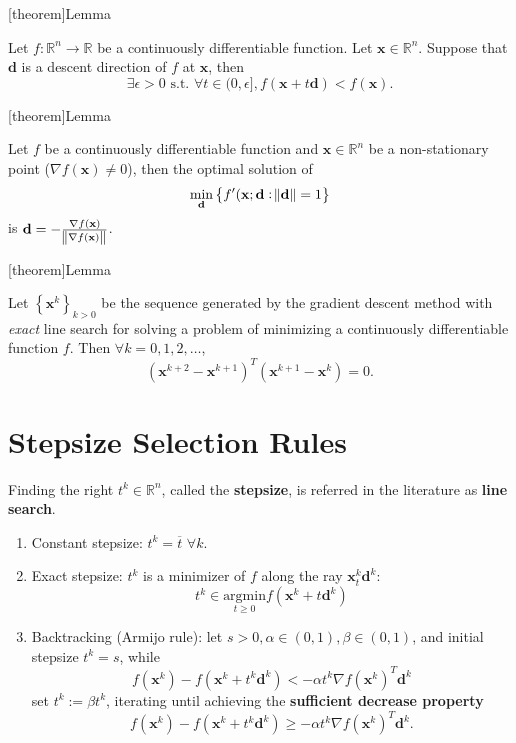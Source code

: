 \documentclass[12pt]{report}
\theoremstyle{definition}
\begin{document}
[theorem]{Lemma}
\begin{descent property}
    Let $f:\mathbb{R}^{n}\rightarrow\mathbb{R}$ be a continuously differentiable function.
    Let $\mathbf{x}\in\mathbb{R}^{n}$. 
    Suppose that $\mathbf{d}$ is a descent direction of $f$ at $\mathbf{x}$,
    then
    \[
        \exists\epsilon>0\text{ s.t. }\forall
        t\in(0,\epsilon],f(\mathbf{x}+t\mathbf{d})<f(\mathbf{x}).
    \]
\end{descent property}

[theorem]{Lemma}
\begin{descent optimal direction}
    Let $f$ be a continuously differentiable function and
    $\mathbf{x}\in\mathbb{R}^{n}$ be a non-stationary point ($\nabla
    f(\mathbf{x})\neq 0$), then the optimal solution of
    \[
        \underset{\mathbf{d}}{\text{min}}\left\{f'(\mathbf{x};\mathbf{d}:\norm{\mathbf{d}}=1\right\}
    \]
    is $\mathbf{d}=-\frac{\nabla f(\mathbf{x})}{\norm{\nabla f(\mathbf{x})}}$.
\end{descent optimal direction}

[theorem]{Lemma}
\begin{zig-zag effect}
    Let ${\left\{\mathbf{x}^k\right\}}_{k>0}$ be the sequence generated by the
    gradient descent method with \emph{exact} line search for solving a problem
    of minimizing a continuously differentiable function $f$. Then $\forall
    k=0,1,2,\ldots$,
    \[
        {(\mathbf{x}^{k+2}-\mathbf{x}^{k+1})}^{T}
        (\mathbf{x}^{k+1}-\mathbf{x}^k)=0.
    \]
\end{zig-zag effect}


\section{Stepsize Selection Rules}

Finding the right $t^k\in\mathbb{R}^{n}$, called the \textbf{stepsize}, is
referred in the literature as \textbf{line search}.

\begin{enumerate}
    \item Constant stepsize: $t^k=\overline{t}$ $\forall k$.
    \item Exact stepsize: $t^{k}$ is a minimizer of $f$ along the ray
        $\mathbf{x}^{k}_t\mathbf{d}^{k}$:
        \[
            t^{k}\in \underset{t\ge
            0}{\text{argmin}}f(\mathbf{x}^{k}+t\mathbf{d}^{k})
        \]
    \item Backtracking (Armijo rule): let $s>0,\alpha\in(0,1),\beta\in(0,1)$,
        and initial stepsize $t^k=s$, while
        \[
            f(\mathbf{x}^k)-f(\mathbf{x}^k+t^k\mathbf{d}^k)<-\alpha t^k\nabla
            f(\mathbf{x}^k)^T\mathbf{d}^k
        \]
        set $t^k:=\beta t^k$, iterating until achieving the \textbf{sufficient
        decrease property}
        \[
            f(\mathbf{x}^k)-f(\mathbf{x}^k+t^k\mathbf{d}^k)\ge -\alpha t^k\nabla
            f(\mathbf{x}^k)^T\mathbf{d}^k.
        \]
\end{enumerate} 
\end{document}
